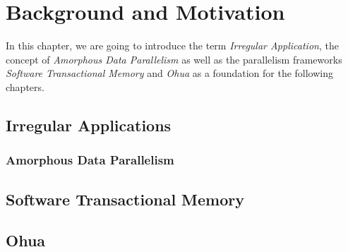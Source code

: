 %
\chapter{Background and Motivation}%
\label{sec:background}

In this chapter, we are going to introduce the term \emph{Irregular Application}, the concept of \emph{Amorphous Data Parallelism} as well as the parallelism frameworks \emph{Software Transactional Memory} and \emph{Ohua} as a foundation for the following chapters.

\section{Irregular Applications}

\subsection{Amorphous Data Parallelism}


\section{Software Transactional Memory}


\section{Ohua}



